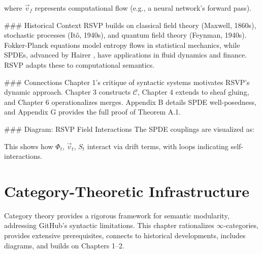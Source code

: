 \documentclass[12pt]{article}
\begin{document}
{where $\vec{v}_f$ represents computational flow (e.g., a neural network’s forward pass).

### Historical Context
RSVP builds on classical field theory (Maxwell, 1860s), stochastic processes (Itô, 1940s), and quantum field theory (Feynman, 1940s). Fokker-Planck equations model entropy flows in statistical mechanics, while SPDEs, advanced by Hairer \cite{hairer2014theory}, have applications in fluid dynamics and finance. RSVP adapts these to computational semantics.

### Connections
Chapter 1’s critique of syntactic systems motivates RSVP’s dynamic approach. Chapter 3 constructs $\mathcal{C}$, Chapter 4 extends to sheaf gluing, and Chapter 6 operationalizes merges. Appendix B details SPDE well-posedness, and Appendix G provides the full proof of Theorem A.1.

### Diagram: RSVP Field Interactions
The SPDE couplings are visualized as:

\begin{center}
\end{center}

This shows how $\Phi_t$, $\vec{v}_t$, $S_t$ interact via drift terms, with loops indicating self-interactions.

\section{Category-Theoretic Infrastructure}
\label{sec:chapter3}

Category theory provides a rigorous framework for semantic modularity, addressing GitHub’s syntactic limitations. This chapter rationalizes $\infty$-categories, provides extensive prerequisites, connects to historical developments, includes diagrams, and builds on Chapters 1–2.

}
\end{document}
